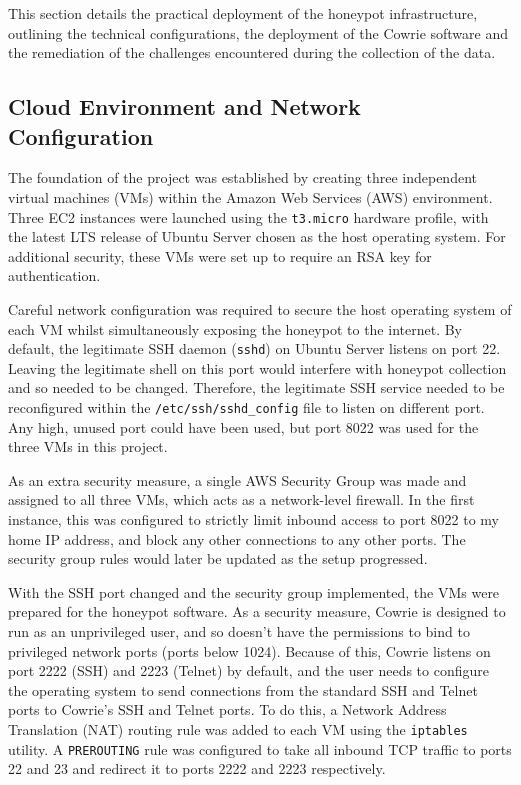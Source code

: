 \documentclass[]{article}
\begin{document}
This section details the practical deployment of the honeypot infrastructure, outlining the technical configurations, the deployment of the Cowrie software and the remediation of the challenges encountered during the collection of the data.

\subsection{Cloud Environment and Network Configuration}

The foundation of the project was established by creating three independent virtual machines (VMs) within the Amazon Web Services (AWS) environment. Three EC2 instances were launched using the \texttt{t3.micro} hardware profile, with the latest LTS release of Ubuntu Server chosen as the host operating system. For additional security, these VMs were set up to require an RSA key for authentication.

Careful network configuration was required to secure the host operating system of each VM whilst simultaneously exposing the honeypot to the internet. By default, the legitimate SSH daemon (\texttt{sshd}) on Ubuntu Server listens on port 22. Leaving the legitimate shell on this port would interfere with honeypot collection and so needed to be changed. Therefore, the legitimate SSH service needed to be reconfigured within the \texttt{/etc/ssh/sshd\_config} file to listen on different port. Any high, unused port could have been used, but port 8022 was used for the three VMs in this project.

As an extra security measure, a single AWS Security Group was made and assigned to all three VMs, which acts as a network-level firewall. In the first instance, this was configured to strictly limit inbound access to port 8022 to my home IP address, and block any other connections to any other ports. The security group rules would later be updated as the setup progressed.

With the SSH port changed and the security group implemented, the VMs were prepared for the honeypot software. As a security measure, Cowrie is designed to run as an unprivileged user, and so doesn't have the permissions to bind to privileged network ports (ports below 1024). Because of this, Cowrie listens on port 2222 (SSH) and 2223 (Telnet) by default, and the user needs to configure the operating system to send connections from the standard SSH and Telnet ports to Cowrie's SSH and Telnet ports. To do this, a Network Address Translation (NAT) routing rule was added to each VM using the \texttt{iptables} utility. A \texttt{PREROUTING} rule was configured to take all inbound TCP traffic to ports 22 and 23 and redirect it to ports 2222 and 2223 respectively.
\end{document}
